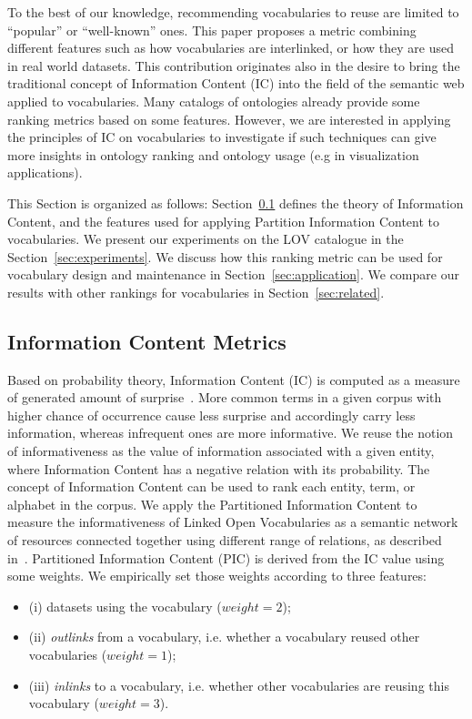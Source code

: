 \begin{description}
To the best of our knowledge, recommending vocabularies to reuse are limited to ``popular'' or ``well-known'' ones. This paper proposes a metric combining different features such as how vocabularies are interlinked, or how they are used in real world datasets. This contribution originates also in the desire to bring the traditional concept of Information Content (IC) into the field of the semantic web applied to vocabularies. Many catalogs of ontologies already provide some ranking metrics based on some features. However, we are interested in applying the principles of IC on vocabularies to investigate if such techniques can give more insights in ontology ranking and ontology usage (e.g in visualization applications).

This Section is organized as follows: Section~\ref{sec:theory} defines the theory of Information Content, and the features used for applying Partition Information Content to vocabularies. We present our experiments on the LOV catalogue in the Section~\ref{sec:experiments}. We discuss how this ranking metric can be used for vocabulary design and maintenance in Section~\ref{sec:application}. We compare our results with other rankings for vocabularies in Section~\ref{sec:related}.



\subsection{Information Content Metrics}
\label{sec:theory}
Based on probability theory, Information Content (IC) is computed as a measure of generated amount of surprise~\cite{ross02}. More common terms in a given corpus with higher chance of occurrence cause less surprise and accordingly carry less information, whereas infrequent ones are more informative. We reuse the notion of informativeness as the value of information associated with a given entity, where Information Content has a negative relation with its probability. The concept of Information Content can be used to rank each entity, term, or alphabet in the corpus. We apply the Partitioned Information Content to measure the informativeness of Linked Open Vocabularies as a semantic network of resources connected together using different range of relations, as described in~\cite{Meymandpour13}. Partitioned Information Content (PIC) is derived from the IC value using some weights. We empirically set those weights according to three features:
\begin{itemize}
 \item (i) datasets using the vocabulary ($weight = 2$);
 \item (ii) \textit{outlinks} from a vocabulary, i.e. whether a vocabulary reused other vocabularies ($weight = 1$);
 \item (iii) \textit{inlinks} to a vocabulary, i.e. whether other vocabularies are reusing this vocabulary ($weight = 3$).
\end{itemize}


\end{description}

